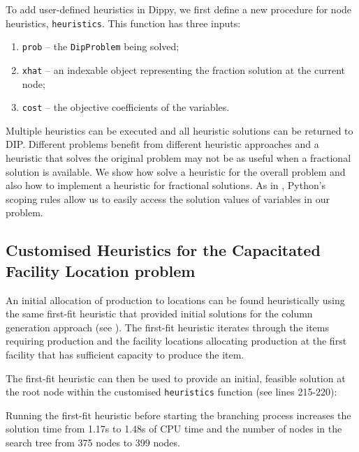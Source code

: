 To add user-defined heuristics in Dippy, we first define a new procedure for node heuristics, \texttt{heuristics}. This function has three inputs:
\begin{enumerate}
\item \texttt{prob} -- the \texttt{DipProblem} being solved;
\item \texttt{xhat} -- an indexable object representing the fraction solution at the current node;
\item \texttt{cost} -- the objective coefficients of the variables.
\end{enumerate}
Multiple heuristics can be executed and all heuristic solutions can be returned to \ac{DIP}. Different problems benefit from different heuristic approaches and a heuristic that solves the original problem may not be as useful when a fractional solution is available. We show how solve a heuristic for the overall problem and also how to implement a heuristic for fractional solutions. As in , Python's scoping rules allow us to easily access the solution values of variables in our problem.

\subsection{Customised Heuristics for the Capacitated Facility Location problem} \label{sbs:fac_heur}

An initial allocation of production to locations can be found heuristically using the same first-fit heuristic that provided initial solutions for the column generation approach (see ). The first-fit heuristic iterates through the items requiring production and the facility locations allocating production at the first facility that has sufficient capacity to produce the item.


\vfill
\newpage


The first-fit heuristic can then be used to provide an initial, feasible solution at the root node within the customised \texttt{heuristics} function (see lines 215-220):


Running the first-fit heuristic before starting the branching process increases the solution time from 1.17s to 1.48s of CPU time and the number of nodes in the search tree from 375 nodes to 399 nodes.

